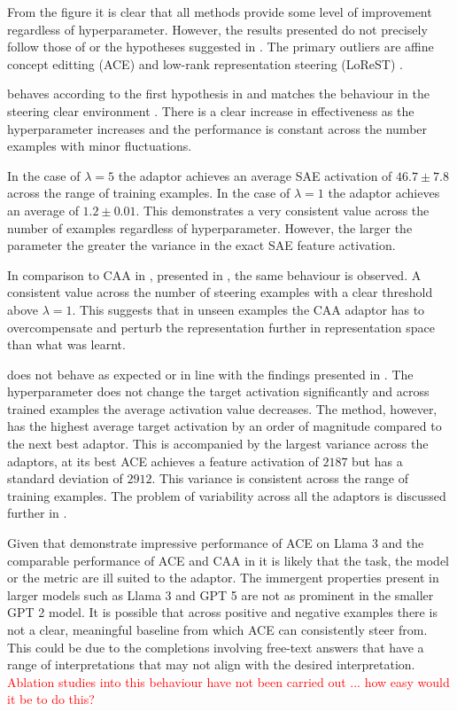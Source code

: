 From the figure it is clear that all methods provide some level of improvement regardless of hyperparameter.
However, the results presented do not precisely follow those of \citet{steering-clear} or the hypotheses suggested in .
The primary outliers are affine concept editting (ACE) \citep{ace} and low-rank representation steering (LoReST) \citep{steering-clear}.

 behaves according to the first hypothesis in  and matches the behaviour in the steering clear environment .
There is a clear increase in effectiveness as the hyperparameter increases and the performance is constant across the number examples with minor fluctuations.

In the case of $\lambda = 5$ the adaptor achieves an average SAE activation of $46.7 \pm 7.8$ across the range of training examples.
In the case of $\lambda = 1$ the adaptor achieves an average of $1.2 \pm 0.01$.
This demonstrates a very consistent value across the number of examples regardless of hyperparameter.
However, the larger the parameter the greater the variance in the exact SAE feature activation.

In comparison to CAA in \citet{steering-clear}, presented in , the same behaviour is observed.
A consistent value across the number of steering examples with a clear threshold above $\lambda = 1$.
This suggests that in unseen examples the CAA adaptor has to overcompensate and perturb the representation further in representation space than what was learnt.

 does not behave as expected or in line with the findings presented in .
The hyperparameter does not change the target activation significantly and across trained examples the average activation value decreases.
The method, however, has the highest average target activation by an order of magnitude compared to the next best adaptor.
This is accompanied by the largest variance across the adaptors, at its best ACE achieves a feature activation of $2187$ but has a standard deviation of $2912$.
This variance is consistent across the range of training examples.
The problem of variability across all the adaptors is discussed further in .

Given that \citet{ace} demonstrate impressive performance of ACE on Llama 3 \citep{llama3} and the comparable performance of ACE and CAA in  it is likely that the task, the model or the metric are ill suited to the adaptor.
The immergent properties present in larger models such as Llama 3 \citep{llama3} and GPT 5 \citep{gpt-5} are not as prominent in the smaller GPT 2 \citep{gpt-2} model.
It is possible that across positive and negative examples there is not a clear, meaningful baseline from which ACE can consistently steer from.
This could be due to the completions involving free-text answers that have a range of interpretations that may not align with the desired interpretation.
\textcolor{red}{Ablation studies into this behaviour have not been carried out ... how easy would it be to do this?}

